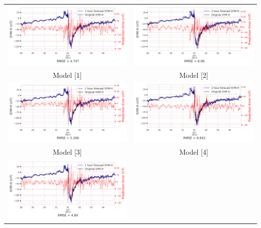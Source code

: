 \documentclass[draft,sw]{agutexSI2019}
\begin{document}
\begin{table}
\centering
\begin{tabular}{cc}
\includegraphics[width=0.49\linewidth]{paper_plots/1h_swics/1h_swics_storm_39.png}
&
\includegraphics[width=0.49\linewidth]{paper_plots/2h_swics/2h_swics_storm_39.png}
\\
Model [1] & Model [2]
\vspace*{12pt}
\\
\includegraphics[width=0.49\linewidth]{paper_plots/1h_no_swics/1h_no_swics_storm_39.png}
&
\includegraphics[width=0.49\linewidth]{paper_plots/2h_no_swics/2h_no_swics_storm_39.png}
\\
Model [3] & Model [4]
\vspace*{12pt}
\\
\includegraphics[width=0.49\linewidth]{paper_plots/1h_swics_model_on_no_swics/1h_swics_model_on_no_swics_storm_39.png}

\end{tabular}
\end{table}
\end{document}
